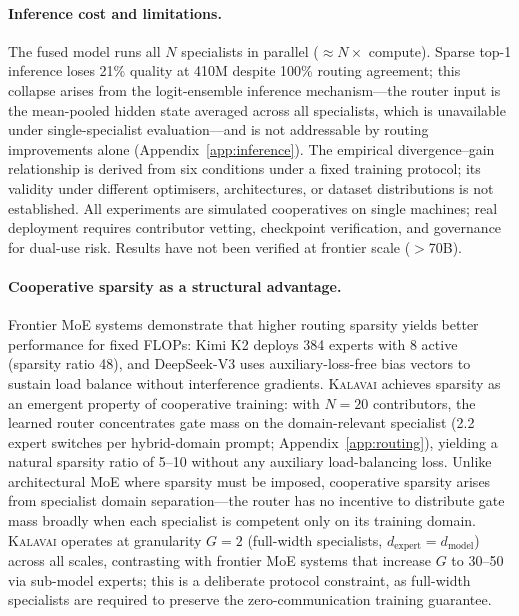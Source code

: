\documentclass{article}
\newcommand{\kalavai}{\textsc{Kalavai}\xspace}
\begin{document}
\paragraph{Inference cost and limitations.} The fused model runs all $N$ specialists in parallel ($\approx N\times$ compute). Sparse top-1 inference loses 21\% quality at 410M despite 100\% routing agreement; this collapse arises from the logit-ensemble inference mechanism---the router input is the mean-pooled hidden state averaged across all specialists, which is unavailable under single-specialist evaluation---and is not addressable by routing improvements alone (Appendix~\ref{app:inference}). The empirical divergence--gain relationship is derived from six conditions under a fixed training protocol; its validity under different optimisers, architectures, or dataset distributions is not established. All experiments are simulated cooperatives on single machines; real deployment requires contributor vetting, checkpoint verification, and governance for dual-use risk. Results have not been verified at frontier scale ($>$70B).

\paragraph{Cooperative sparsity as a structural advantage.} Frontier MoE systems demonstrate that higher routing sparsity yields better performance for fixed FLOPs: Kimi K2 \citep{moonshotai2025kimik2} deploys 384 experts with 8 active (sparsity ratio 48), and DeepSeek-V3 \citep{liu2024deepseekv3} uses auxiliary-loss-free bias vectors to sustain load balance without interference gradients. \kalavai achieves sparsity as an emergent property of cooperative training: with $N=20$ contributors, the learned router concentrates gate mass on the domain-relevant specialist (2.2 expert switches per hybrid-domain prompt; Appendix~\ref{app:routing}), yielding a natural sparsity ratio of 5--10 without any auxiliary load-balancing loss. Unlike architectural MoE where sparsity must be imposed, cooperative sparsity arises from specialist domain separation---the router has no incentive to distribute gate mass broadly when each specialist is competent only on its training domain. \kalavai operates at granularity $G=2$ (full-width specialists, $d_\text{expert}=d_\text{model}$) across all scales, contrasting with frontier MoE systems that increase $G$ to 30--50 via sub-model experts; this is a deliberate protocol constraint, as full-width specialists are required to preserve the zero-communication training guarantee.
\end{document}
